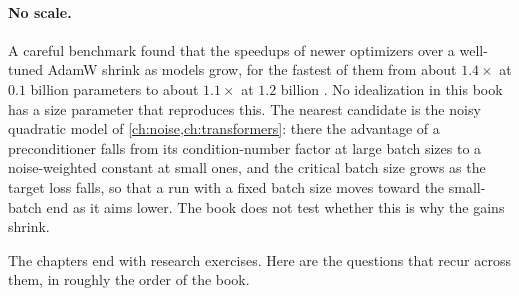 \begin{refsection}
\paragraph{No scale.} A careful benchmark found that the speedups of newer optimizers over a well-tuned AdamW shrink as models grow, for the fastest of them from about $1.4\times$ at $0.1$ billion parameters to about $1.1\times$ at $1.2$ billion \parencite{WenEtAl2026Fantastic}. No idealization in this book has a size parameter that reproduces this. The nearest candidate is the noisy quadratic model of \cref{ch:noise,ch:transformers}: there the advantage of a preconditioner falls from its condition-number factor at large batch sizes to a noise-weighted constant at small ones, and the critical batch size grows as the target loss falls, so that a run with a fixed batch size moves toward the small-batch end as it aims lower. The book does not test whether this is why the gains shrink.


The chapters end with research exercises. Here are the questions that recur across them, in roughly the order of the book.


\end{refsection}
